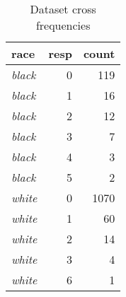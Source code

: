 \begin{wraptable}{r}{2in}

\caption{\label{tab:dataset_crosscount}Dataset cross frequencies}
\centering
\fontsize{9}{11}\selectfont
\begin{tabular}[t]{>{}lrr}
\toprule
race & resp & count\\
\midrule
\em{black} & 0 & 119\\
\em{black} & 1 & 16\\
\em{black} & 2 & 12\\
\em{black} & 3 & 7\\
\em{black} & 4 & 3\\
\addlinespace
\em{black} & 5 & 2\\
\em{white} & 0 & 1070\\
\em{white} & 1 & 60\\
\em{white} & 2 & 14\\
\em{white} & 3 & 4\\
\addlinespace
\em{white} & 6 & 1\\
\bottomrule
\end{tabular}
\end{wraptable}
